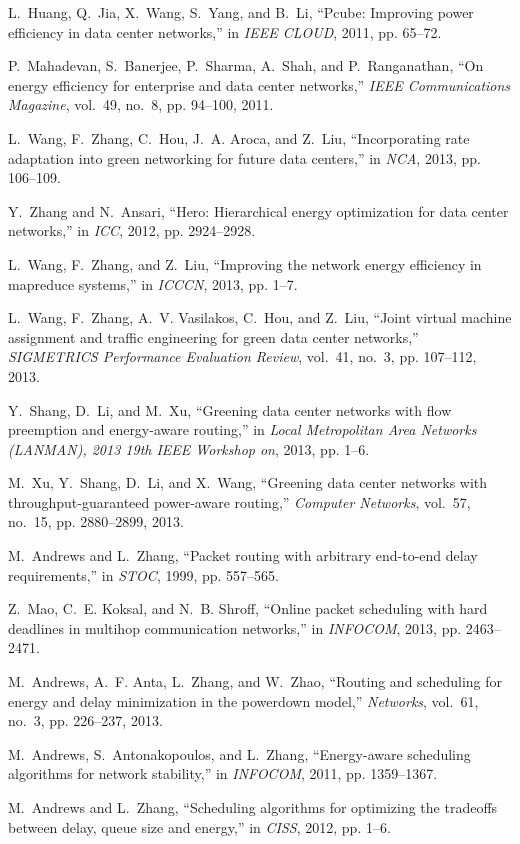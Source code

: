 \documentclass[10pt, conference, compsocconf]{IEEEtran}
\begin{document}
\begin{thebibliography}{1}
L.~Huang, Q.~Jia, X.~Wang, S.~Yang, and B.~Li, ``Pcube: Improving power
  efficiency in data center networks,'' in \emph{IEEE CLOUD}, 2011, pp. 65--72.

P.~Mahadevan, S.~Banerjee, P.~Sharma, A.~Shah, and P.~Ranganathan, ``On energy
  efficiency for enterprise and data center networks,'' \emph{IEEE
  Communications Magazine}, vol.~49, no.~8, pp. 94--100, 2011.

L.~Wang, F.~Zhang, C.~Hou, J.~A. Aroca, and Z.~Liu, ``Incorporating rate
  adaptation into green networking for future data centers,'' in \emph{NCA},
  2013, pp. 106--109.

Y.~Zhang and N.~Ansari, ``Hero: Hierarchical energy optimization for data
  center networks,'' in \emph{ICC}, 2012, pp. 2924--2928.

L.~Wang, F.~Zhang, and Z.~Liu, ``Improving the network energy efficiency in
  mapreduce systems,'' in \emph{ICCCN}, 2013, pp. 1--7.

L.~Wang, F.~Zhang, A.~V. Vasilakos, C.~Hou, and Z.~Liu, ``Joint virtual machine
  assignment and traffic engineering for green data center networks,''
  \emph{SIGMETRICS Performance Evaluation Review}, vol.~41, no.~3, pp.
  107--112, 2013.

Y.~Shang, D.~Li, and M.~Xu, ``Greening data center networks with flow
  preemption and energy-aware routing,'' in \emph{Local Metropolitan Area
  Networks (LANMAN), 2013 19th IEEE Workshop on}, 2013, pp. 1--6.

M.~Xu, Y.~Shang, D.~Li, and X.~Wang, ``Greening data center networks with
  throughput-guaranteed power-aware routing,'' \emph{Computer Networks},
  vol.~57, no.~15, pp. 2880--2899, 2013.

M.~Andrews and L.~Zhang, ``Packet routing with arbitrary end-to-end delay
  requirements,'' in \emph{STOC}, 1999, pp. 557--565.

Z.~Mao, C.~E. Koksal, and N.~B. Shroff, ``Online packet scheduling with hard
  deadlines in multihop communication networks,'' in \emph{INFOCOM}, 2013, pp.
  2463--2471.

M.~Andrews, A.~F. Anta, L.~Zhang, and W.~Zhao, ``Routing and scheduling for
  energy and delay minimization in the powerdown model,'' \emph{Networks},
  vol.~61, no.~3, pp. 226--237, 2013.

M.~Andrews, S.~Antonakopoulos, and L.~Zhang, ``Energy-aware scheduling
  algorithms for network stability,'' in \emph{INFOCOM}, 2011, pp. 1359--1367.

M.~Andrews and L.~Zhang, ``Scheduling algorithms for optimizing the tradeoffs
  between delay, queue size and energy,'' in \emph{CISS}, 2012, pp. 1--6.

\end{thebibliography}
\end{document}
